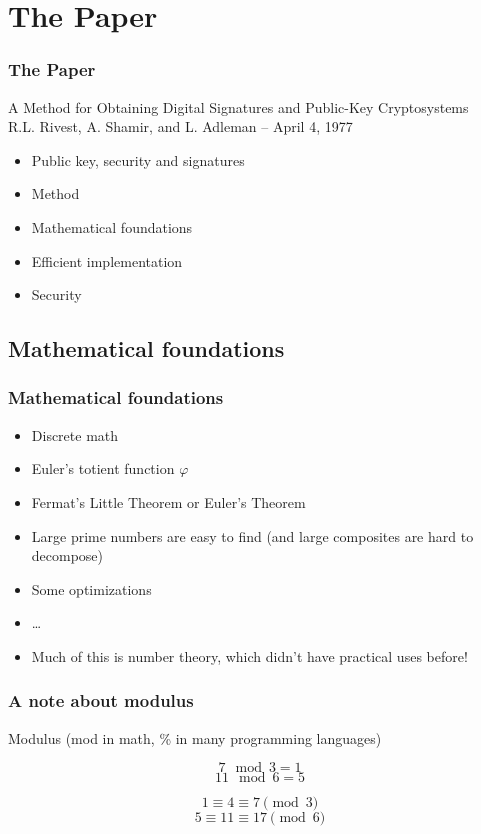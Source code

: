 \documentclass{beamer}
\begin{document}
\section{The Paper}

\begin{frame}
	\frametitle{The Paper}
		A Method for Obtaining Digital Signatures and Public-Key Cryptosystems \\
		R.L. Rivest, A. Shamir, and L. Adleman -- April 4, 1977
		\begin{itemize}
			\item Public key, security and signatures
			\item Method
			\item Mathematical foundations
			\item Efficient implementation
			\item Security
		\end{itemize}
\end{frame}

\subsection{Mathematical foundations}

\begin{frame}
	\frametitle{Mathematical foundations}
	\begin{itemize}
		\item Discrete math
		\item Euler's totient function $\varphi$
		\item Fermat's Little Theorem or Euler's Theorem
		\item Large prime numbers are easy to find (and large
		      composites are hard to decompose)
		\item Some optimizations
		\item \dots
		\item Much of this is number theory, which didn't have
                      practical uses before!
	\end{itemize}
\end{frame}

\begin{frame}
	\frametitle{A note about modulus}

	Modulus (mod in math, \% in many programming languages)

	$$ 7 \mod 3 = 1 $$
	$$ 11 \mod 6 = 5 $$

	$$ 1 \equiv 4 \equiv 7 \pmod{3} $$
	$$ 5 \equiv 11 \equiv 17 \pmod{6} $$
\end{frame}
\end{document}
